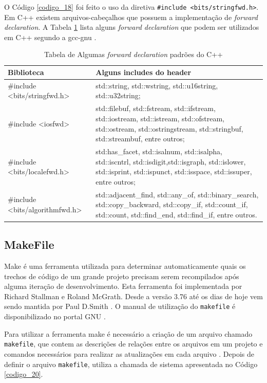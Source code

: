 O Código \ref{codigo_18} foi feito o uso da diretiva \texttt{\#include
 <bits/stringfwd.h>}. Em C++  existem arquivos-cabeçalhos que possuem a
 implementação de \textit{forward declaration}. A Tabela \ref{tab:tabela_04} lista 
 alguns \textit{forward declaration} que podem ser utilizados em C++ segundo
 a gcc-gnu \cite{gccapi}.

\begin{table}[h]
    \centering
	\caption {Tabela de Algumas \textit{forward declaration} padrões do C++}
    \label{tab:tabela_04}
	\begin{tabularx}{0.95\textwidth}{>{\ttfamily}l>{\ttfamily}X}
	\toprule
	\textbf{Biblioteca} & \textbf{Alguns includes do header}\\
	\midrule
	\#include <bits/stringfwd.h> & std::string, std::wstring, std::u16string, std::u32string; \\
	\midrule
	\#include <iosfwd>          & std::filebuf, std::fstream, std::ifstream, std::iostream, std::istream, std::ofstream, std::ostream, std::ostringstream, std::stringbuf, std::streambuf, entre outros;\\
	\midrule
	\#include <bits/localefwd.h> & std:has\_facet, std::isalnum, std::isalpha, std::iscntrl, std::isdigit,std::isgraph, std::islower, std::isprint, std::ispunct, std::isspace, std::issuper, entre outros;\\
	\midrule
	\#include <bits/algorithmfwd.h> & std::adjacent\_find, std::any\_of, std::binary\_search, std::copy\_backward, std::copy\_if, std::count\_if, std::count, std::find\_end, std::find\_if, entre outros.\\
	\bottomrule
	\end{tabularx}
\end{table}


\subsection{MakeFile}\label{Makefile_section}


Make é uma ferramenta utilizada para determinar automaticamente quais
 os trechos de código de um grande projeto precisam serem recompilados
 após alguma iteração de desenvolvimento. Esta ferramenta foi implementada
 por Richard Stallman e Roland McGrath. Desde a versão 3.76 até os dias de
 hoje vem sendo mantida por Paul D.Smith \cite{Lasca2}. O manual de utilização do \texttt{makefile}
 é disponibilizado no portal GNU \cite{ref45}.

Para utilizar a ferramenta make é necessário a criação de um arquivo chamado
 \texttt{makefile}, que contem as descrições de relações entre os arquivos em um projeto
 e comandos necessários para realizar as atualizações em cada arquivo \cite{Lasca2}.
 Depois de definir o arquivo \texttt{makefile}, utiliza a chamada de sistema apresentada 
no Código \ref{codigo_20}.

